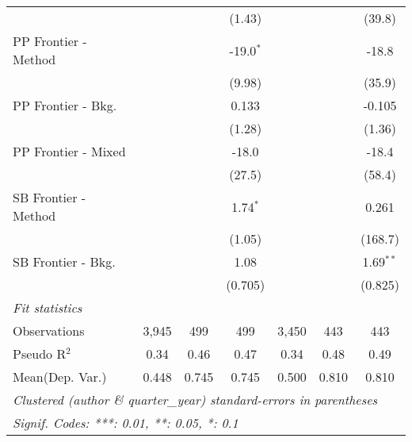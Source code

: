\begin{tabular}{lcccccc}
                        &         &              & (1.43)      &              &            & (39.8)\\   
   PP Frontier - Method &         &              & -19.0$^{*}$ &              &            & -18.8\\   
                        &         &              & (9.98)      &              &            & (35.9)\\   
   PP Frontier - Bkg.   &         &              & 0.133       &              &            & -0.105\\   
                        &         &              & (1.28)      &              &            & (1.36)\\   
   PP Frontier - Mixed  &         &              & -18.0       &              &            & -18.4\\   
                        &         &              & (27.5)      &              &            & (58.4)\\   
   SB Frontier - Method &         &              & 1.74$^{*}$  &              &            & 0.261\\   
                        &         &              & (1.05)      &              &            & (168.7)\\   
   SB Frontier - Bkg.   &         &              & 1.08        &              &            & 1.69$^{**}$\\   
                        &         &              & (0.705)     &              &            & (0.825)\\   
   \midrule
   \emph{Fit statistics}\\
   Observations         & 3,945   & 499          & 499         & 3,450        & 443        & 443\\  
   Pseudo R$^2$         & 0.34    & 0.46         & 0.47        & 0.34         & 0.48       & 0.49\\  
Mean(Dep. Var.) & 0.448 & 0.745 & 0.745 & 0.500 & 0.810 & 0.810 \\
   \midrule \midrule
   \multicolumn{7}{l}{\emph{Clustered (author \& quarter\_year) standard-errors in parentheses}}\\
   \multicolumn{7}{l}{\emph{Signif. Codes: ***: 0.01, **: 0.05, *: 0.1}}\\
\end{tabular}
\par\endgroup
